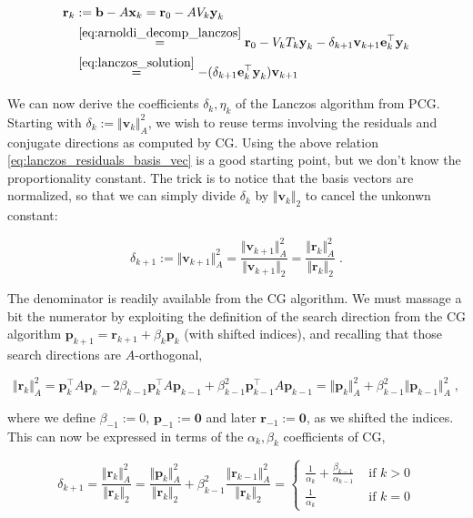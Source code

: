 \documentclass{article}
\newcommand{\vect}[1]{\boldsymbol{\mathbf{#1}}}
\newcommand{\norm}[1]{\Vert #1 \Vert}
\begin{document}
\begin{align}
    \vect r_k &:= \vect b - A \vect x_k = \vect r_0 - A V_k \vect y_k\\
    &\stackrel{\eqref{eq:arnoldi_decomp_lanczos}}{=} \vect r_0 - V_k T_k \vect y_k - \delta_{k+1} \vect v_{k+1} \vect e_k^\top \vect y_k\\
    &\stackrel{\eqref{eq:lanczos_solution}}{=} -(\delta_{k+1} \vect e_k^\top \vect y_k) \vect v_{k+1} \label{eq:lanczos_residuals_basis_vec}
\end{align}

We can now derive the coefficients $\delta_k, \eta_k$ of the Lanczos algorithm from PCG. Starting with $\delta_{k} := \norm{\vect v_k}_A^2$, we wish to reuse terms involving the residuals and conjugate directions as computed by CG. Using the above relation \eqref{eq:lanczos_residuals_basis_vec} is a good starting point, but we don't know the proportionality constant. The trick is to notice that the basis vectors are normalized, so that we can simply divide $\delta_k$ by $\norm{\vect v_k}_2$ to cancel the unkonwn constant:

\begin{equation*}
    \delta_{k+1} := \norm{\vect v_{k+1}}_A^2 = \frac{\norm{\vect v_{k+1}}_A^2}{\norm{\vect v_{k+1}}_2} = \frac{\norm{\vect r_{k}}_A^2}{\norm{\vect r_k}_2} \; .
\end{equation*}

The denominator is readily available from the CG algorithm. We must massage a bit the numerator by exploiting the definition of the search direction from the CG algorithm $\vect p_{k+1} = \vect r_{k+1} + \beta_k \vect p_k$ (with shifted indices), and recalling that those search directions are $A$-orthogonal,

\begin{equation*}
    \norm{\vect r_{k}}_A^2 = \vect p_k^\top A \vect p_k - 2 \beta_{k-1} \vect p_k^\top A \vect p_{k-1} + \beta_{k-1}^2 \vect p_{k-1}^\top A \vect p_{k-1} = \norm{\vect p_{k}}_A^2 + \beta_{k-1}^2 \norm{\vect p_{k-1}}_A^2 \; ,
\end{equation*}

where we define $\beta_{-1}:= 0, \, \vect p_{-1} := \vect0$ and later $\vect r_{-1} := \vect 0$, as we shifted the indices. This can now be expressed in terms of the $\alpha_k, \beta_k$ coefficients of CG, 

\begin{equation*}
    \delta_{k+1} = \frac{\norm{\vect r_{k}}_A^2}{\norm{\vect r_k}_2} = \frac{\norm{\vect p_{k}}_A^2}{\norm{\vect r_k}_2} + \beta_{k-1}^2 \frac{\norm{\vect r_{k-1}}_A^2}{\norm{\vect r_k}_2} = \begin{cases}
    \frac {1}{\alpha_k} + \frac{\beta_{k-1}}{\alpha_{k-1}} & \text{ if } k > 0\\
    \frac {1}{\alpha_k} & \text{ if } k = 0
    \end{cases}
\end{equation*}
\end{document}
